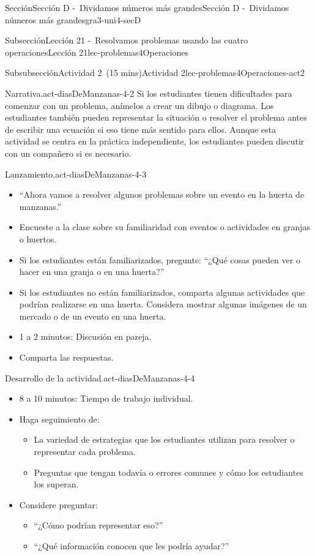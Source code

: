 \documentclass[oneside,10pt,]{article}
\begin{document}
\begin{sectionptx}{Sección}{Sección D -~Dividamos números más grandes}{}{Sección D -~Dividamos números más grandes}{}{}{gra3-uni4-secD}
\begin{subsectionptx}{Subsección}{Lección 21 -~Resolvamos problemas usando las cuatro operaciones}{}{Lección 21}{}{}{lec-problemas4Operaciones}
\begin{subsubsectionptx}{Subsubsección}{Actividad 2~(15 mins)}{}{Actividad 2}{}{}{lec-problemas4Operaciones-act2}
\begin{paragraphs}{Narrativa.}{act-diasDeManzanas-4-2}
Si los estudiantes tienen dificultades para comenzar con un problema, anímelos a crear un dibujo o diagrama. Los estudiantes también pueden representar la situación o resolver el problema antes de escribir una ecuación si eso tiene más sentido para ellos. Aunque esta actividad se centra en la práctica independiente, los estudiantes pueden discutir con un compañero si es necesario.%
\end{paragraphs}%
\begin{paragraphs}{Lanzamiento.}{act-diasDeManzanas-4-3}%
%
\begin{itemize}[label=\textbullet]
\item{}``Ahora vamos a resolver algunos problemas sobre un evento en la huerta de manzanas.''%
\item{}Encueste a la clase sobre su familiaridad con eventos o actividades en granjas o huertos.%
\item{}Si los estudiantes están familiarizados, pregunte: ``¿Qué cosas pueden ver o hacer en una granja o en una huerta?''%
\item{}Si los estudiantes no están familiarizados, comparta algunas actividades que podrían realizarse en una huerta. Considera mostrar algunas imágenes de un mercado o de un evento en una huerta.%
\item{}1 a 2 minutos: Discusión en pareja.%
\item{}Comparta las respuestas.%
\end{itemize}
\end{paragraphs}%
\begin{paragraphs}{Desarrollo de la actividad.}{act-diasDeManzanas-4-4}%
%
\begin{itemize}[label=\textbullet]
\item{}8 a 10 minutos: Tiempo de trabajo individual.%
\item{}Haga seguimiento de:%
%
\begin{itemize}[label=$\circ$]
\item{}La variedad de estrategias que los estudiantes utilizan para resolver o representar cada problema.%
\item{}Preguntas que tengan todavía o errores comunes y cómo los estudiantes los superan.%
\end{itemize}
\item{}Considere preguntar:%
%
\begin{itemize}[label=$\circ$]
\item{}``¿Cómo podrían representar eso?''%
\item{}``¿Qué información conocen que les podría ayudar?''%

\end{itemize}
\end{itemize}
\end{paragraphs}
\end{subsubsectionptx}
\end{subsectionptx}
\end{sectionptx}
\end{document}
